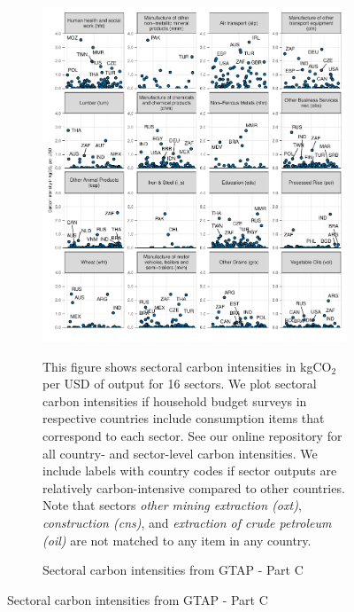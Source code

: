 \begin{figure}[ht!]\ContinuedFloat
\begin{subfigure}[b]{\textwidth}
  \centering
  \includegraphics{Analysis_Carbon_Intensities_GTAP/Figure_2.1.1_C_2017B.pdf}
  \caption{Sectoral carbon intensities from GTAP - Part C} \label{fig:B3}  
  \begin{subcaption2}
    This figure shows sectoral carbon intensities in kgCO$_{2}$ per USD of output for 16 sectors. We plot sectoral carbon intensities if household budget surveys in respective countries include consumption items that correspond to each sector. See our online repository for all country- and sector-level carbon intensities. We include labels with country codes if sector outputs are relatively carbon-intensive compared to other countries. Note that sectors \textit{other mining extraction (oxt)}, \textit{construction (cns)}, and \textit{extraction of crude petroleum (oil)} are not matched to any item in any country.
  \end{subcaption2}
\end{subfigure}
\end{figure}

\clearpage

